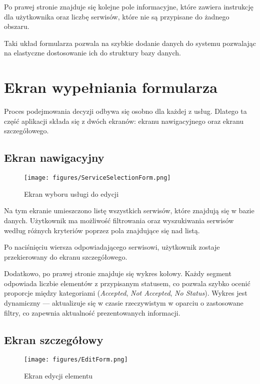 Po  prawej stronie znajduje się kolejne pole informacyjne, które zawiera instrukcję dla użytkownika oraz liczbę serwisów, które nie są przypisane do żadnego obszaru.
\vspace{0.5cm}

Taki układ formularza pozwala na szybkie dodanie danych do systemu pozwalając na elastyczne dostosowanie ich do struktury bazy danych.

\section{Ekran wypełniania formularza}
Proces podejmowania decyzji odbywa się osobno dla każdej z usług. Dlatego ta część aplikacji składa się z dwóch ekranów: ekranu nawigacyjnego oraz ekranu szczegółowego.

\subsection{Ekran nawigacyjny}
\begin{figure}[h]
    \centering
    \texttt{[image: figures/ServiceSelectionForm.png]}
    \caption{Ekran wyboru usługi do edycji}
    \label{fig:ServiceSelectionForm }
\end{figure}

Na tym ekranie umieszczono listę wszystkich serwisów, które znajdują się w bazie danych. Użytkownik ma możliwość filtrowania oraz wyszukiwania serwisów według różnych kryteriów poprzez pola znajdujące się nad listą.

Po naciśnięciu wiersza odpowiadającego serwisowi, użytkownik zostaje przekierowany do ekranu szczegółowego.

Dodatkowo, po prawej stronie znajduje się wykres kołowy. Każdy segment odpowiada liczbie elementów z przypisanym statusem, co pozwala szybko ocenić proporcje między kategoriami (\emph{Accepted}, \emph{Not Accepted}, \emph{No Status}). Wykres jest dynamiczny — aktualizuje się w czasie rzeczywistym w oparciu o zastosowane filtry, co zapewnia aktualność prezentowanych informacji.

\subsection{Ekran szczegółowy}


\begin{figure}[h]
    \centering
    \texttt{[image: figures/EditForm.png]}
    \caption{Ekran edycji elementu}
    \label{fig:EditForm}
\end{figure}


